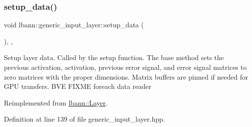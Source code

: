 \subsubsection{\texorpdfstring{setup\+\_\+data()}{setup\_data()}}
{\footnotesize\ttfamily void lbann\+::generic\+\_\+input\+\_\+layer\+::setup\+\_\+data (\begin{DoxyParamCaption}{ }\end{DoxyParamCaption})\hspace{0.3cm}{\ttfamily [inline]}, {\ttfamily [override]}, {\ttfamily [virtual]}}

Setup layer data. Called by the setup function. The base method sets the previous activation, activation, previous error signal, and error signal matrices to zero matrices with the proper dimensions. Matrix buffers are pinned if needed for G\+PU transfers. B\+VE F\+I\+X\+ME foreach data reader 

Reimplemented from \hyperlink{classlbann_1_1Layer_a50a89f8a68762c677d48efe384676e81}{lbann\+::\+Layer}.



Definition at line 139 of file generic\+\_\+input\+\_\+layer.\+hpp.


